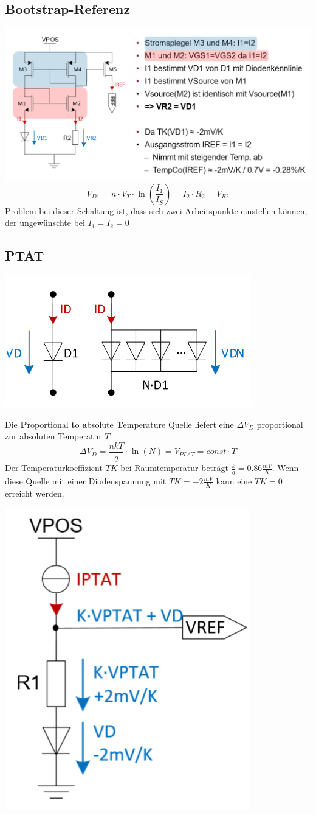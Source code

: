 \subsection{Bootstrap-Referenz}
\includegraphics[width=\columnwidth]{Images/bootstrap_ref}
\[
V_{D1} = n\cdot V_T \cdot \ln\left(\frac{I_1}{I_S}\right) = I_2 \cdot R_2 = V_{R2}
\]
Problem bei dieser Schaltung ist, dass sich zwei Arbeitspunkte einstellen können, der ungewünschte bei $I_1 = I_2 = 0$

\subsection{PTAT}
\begin{center}
	\includegraphics[width=0.5\columnwidth]{Images/pat}
\end{center}
Die \textbf{P}roportional \textbf{t}o \textbf{a}bsolute \textbf{T}emperature Quelle liefert eine $\Delta V_D$ proportional zur absoluten Temperatur $T$.
\[
\Delta V_D = \frac{nkT}{q}\cdot\ln(N) = V_{PTAT} = const \cdot T
\]
Der Temperaturkoeffizient $TK$ bei Raumtemperatur beträgt $\frac{k}{q} = 0.86\frac{mV}{K}$. Wenn diese Quelle mit einer Diodenspannung mit $TK = -2\frac{mV}{K}$ kann eine $TK = 0$ erreicht werden. 

\begin{center}
	\includegraphics[width=0.3\columnwidth]{Images/ptat}
\end{center}

